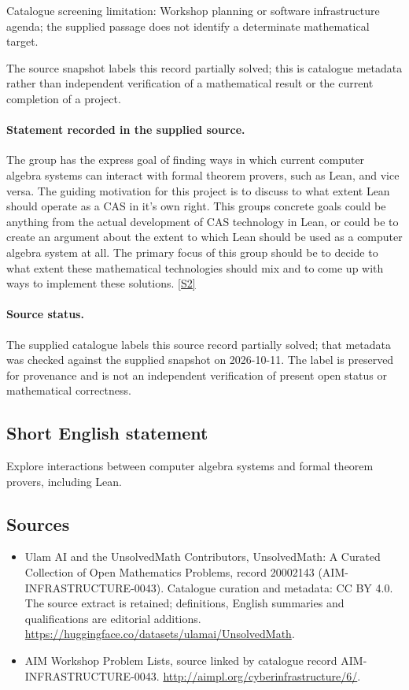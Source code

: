 \documentclass[11pt]{article}
\begin{document}
Catalogue screening limitation: Workshop planning or software infrastructure agenda; the supplied passage does not identify a determinate mathematical target.

The source snapshot labels this record partially solved; this is catalogue metadata rather than independent verification of a mathematical result or the current completion of a project.
\paragraph{Statement recorded in the supplied source.}
The group has the express goal of finding ways in which current computer algebra systems can interact with formal theorem provers, such as Lean, and vice versa. The guiding motivation for this project is to discuss to what extent Lean should operate as a CAS in it's own right. This groups concrete goals could be anything from the actual development of CAS technology in Lean, or could be to create an argument about the extent to which Lean should be used as a computer algebra system at all.
The primary focus of this group should be to decide to what extent these mathematical technologies should mix and to come up with ways to implement these solutions. \href{http://aimpl.org/cyberinfrastructure/6/}{[S2]}
\paragraph{Source status.}
The supplied catalogue labels this source record partially solved; that metadata was checked against the supplied snapshot on 2026-10-11. The label is preserved for provenance and is not an independent verification of present open status or mathematical correctness.
\subsection{Short English statement}
Explore interactions between computer algebra systems and formal theorem provers, including Lean.
\subsection{Sources}
\begin{itemize}
\item[S1] Ulam AI and the UnsolvedMath Contributors, UnsolvedMath: A Curated Collection of Open Mathematics Problems, record 20002143 (AIM-INFRASTRUCTURE-0043). Catalogue curation and metadata: CC BY 4.0. The source extract is retained; definitions, English summaries and qualifications are editorial additions.
\url{https://huggingface.co/datasets/ulamai/UnsolvedMath}.
\item[S2] AIM Workshop Problem Lists, source linked by catalogue record AIM-INFRASTRUCTURE-0043.
\url{http://aimpl.org/cyberinfrastructure/6/}.
\end{itemize}
\end{document}
